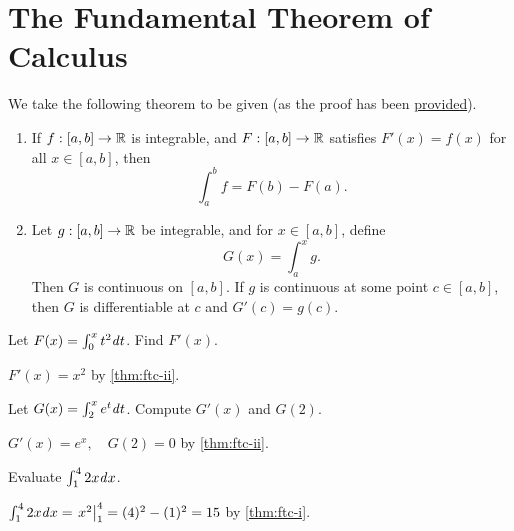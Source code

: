 \section{The Fundamental Theorem of Calculus}

\begin{callout}
  We take the following theorem to be given (as the proof has been
  \href{https://www.youtube.com/watch?v=dgfnO4uDR58}{provided}).
  \begin{theorem}
  \label{thm:ftc}
    \leavevmode
    \begin{enumerate}[label=(\roman*)]
      \item \label{thm:ftc-i} If $f : [a, b] \to \mathbb{R}$ is integrable, and $F : [a, b] \to \mathbb{R}$ satisfies $F'(x) = f(x)$ for all
        $x \in [a, b]$, then
        \[
          \int_{a}^{b} f = F(b) - F(a).
        \]

      \item \label{thm:ftc-ii} Let $g : [a, b] \to \mathbb{R}$ be integrable, and for $x \in [a, b]$, define
        \[
          G(x) = \int_{a}^{x} g.
        \]
        Then $G$ is continuous on $[a, b]$. If $g$ is continuous at some point $c \in [a, b]$,
        then $G$ is differentiable at $c$ and $G'(c) = g(c)$.
    \end{enumerate}
  \end{theorem}
\end{callout}

\begin{problem}
  Let $F(x) = \int_{0}^{x} t^{2} \mathit{d} t$. Find $F'(x)$.
  \vspace{\baselineskip}

  $F'(x) = x^{2}$ by \ref{thm:ftc-ii}.
\end{problem}

\begin{problem}
  Let $G(x) = \int_{2}^{x} e^{t} \mathit{d} t$. Compute $G'(x)$ and $G(2)$.
  \vspace{\baselineskip}

  $G'(x) = e^{x}, \quad G(2) = 0$ by \ref{thm:ftc-ii}.
\end{problem}

\begin{problem}
  Evaluate $\int_{1}^{4} 2x \mathit{d} x$.
  \vspace{\baselineskip}

  $\int_{1}^{4} 2x \mathit{d} x = \left. x^{2} \right\rvert_{1}^{4} = (4)^{2} - (1)^{2} = 15$ by \ref{thm:ftc-i}.
\end{problem}

